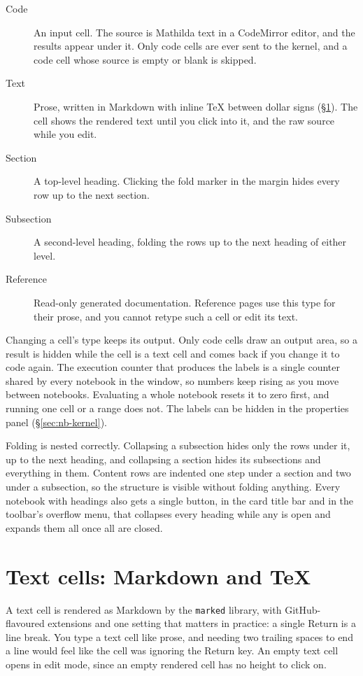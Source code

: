 \begin{description}
\item[Code] An input cell. The source is Mathilda text in a CodeMirror
  editor, and the results appear under it. Only code cells are ever sent to
  the kernel, and a code cell whose source is empty or blank is skipped.
\item[Text] Prose, written in Markdown with inline \TeX{} between dollar
  signs (\S\ref{sec:nb-text}). The cell shows the rendered text until you
  click into it, and the raw source while you edit.
\item[Section] A top-level heading. Clicking the fold marker in the margin
  hides every row up to the next section.
\item[Subsection] A second-level heading, folding the rows up to the next
  heading of either level.
\item[Reference] Read-only generated documentation. Reference pages use this
  type for their prose, and you cannot retype such a cell or edit its text.
\end{description}

Changing a cell's type keeps its output. Only code cells draw an output area,
so a result is hidden while the cell is a text cell and comes back if you
change it to code again. The execution counter that produces the
 labels is a single counter shared by every notebook in the
window, so numbers keep rising as you move between notebooks. Evaluating a
whole notebook resets it to zero first, and running one cell or a range
does not. The labels can be hidden in the properties panel
(\S\ref{sec:nb-kernel}).

Folding is nested correctly. Collapsing a subsection hides only the rows
under it, up to the next heading, and collapsing a section hides its
subsections and everything in them. Content rows are indented one step under
a section and two under a subsection, so the structure is visible without
folding anything. Every notebook with headings also gets a single button,
in the card title bar and in the toolbar's overflow menu, that collapses
every heading while any is open and expands them all once all are closed.

\section{Text cells: Markdown and \TeX{}}
\label{sec:nb-text}

A text cell is rendered as Markdown by the \texttt{marked} library, with
GitHub-flavoured extensions and one setting that matters in practice: a
single Return is a line break. You type a text cell like prose, and needing
two trailing spaces to end a line would feel like the cell was ignoring the
Return key. An empty text cell opens in edit mode, since an empty rendered
cell has no height to click on.

